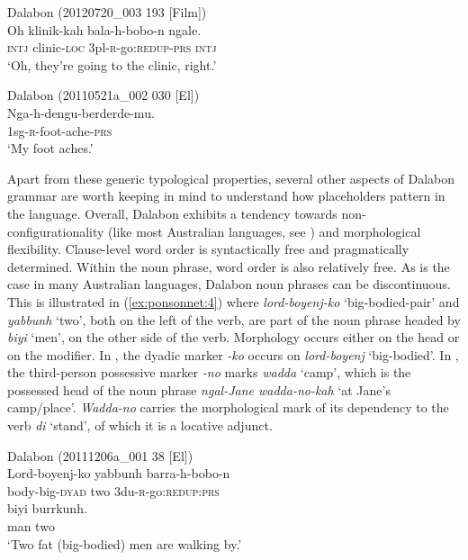 \documentclass[output=paper]{langscibook}
\begin{document}
\ea
{\label{ex:ponsonnet:2} Dalabon (20120720\_003 193 [Film])}\\
\gll Oh   klinik-kah     bala-h-bobo-n     ngale.\\
\textsc{intj}  clinic-\textsc{loc}   3pl-\textsc{r}{}-go:\textsc{redup-prs}  \textsc{intj}\\
\glt ‘Oh, they’re going to the clinic, right.’
\z 


\ea
{\label{ex:ponsonnet:3}
Dalabon (20110521a\_002 030 [El])}\\
\gll Nga-h-dengu-berderde-mu.\\
     1sg\textsc{{}-r-}foot-ache\textsc{{}-prs}\\
\glt ‘My foot aches.’
\z 

Apart from these generic typological properties, several other aspects of Dalabon grammar are worth keeping in mind to understand how placeholders pattern in the language. Overall, Dalabon exhibits a tendency towards non\hyp configurationality (like most Australian languages, see \citealt{AustinAustin1996}) and morphological flexibility. Clause-level word order is syntactically free and pragmatically determined. Within the noun phrase, word order is also relatively free. As is the case in many Australian languages, Dalabon noun phrases can be discontinuous. This is illustrated in (\ref{ex:ponsonnet:4}) where \textit{lord-boyenj-ko} ‘big-bodied-pair’ and \textit{yabbunh} ‘two’, both on the left of the verb, are part of the noun phrase headed by \textit{biyi} ‘men’, on the other side of the verb. Morphology occurs either on the head or on the modifier. In , the dyadic marker \textit{{}-ko} occurs on \textit{lord-boyenj} ‘big-bodied’. In , the third-person possessive marker \textit{{}-no} marks \textit{wadda} ‘camp’, which is the possessed head of the noun phrase \textit{ngal-Jane wadda-no-kah} ‘at Jane’s camp/place’. \textit{Wadda-no} carries the morphological mark of its dependency to the verb \textit{di} ‘stand’, of which it is a locative adjunct.
 
\ea
{ \label{ex:ponsonnet:4}
Dalabon (20111206a\_001 38 [El])}\\
\gll Lord-boyenj-ko   yabbunh   barra-h-bobo-n\\
body-big-\textsc{dyad}  two    3du-\textsc{r}{}-go:\textsc{redup:prs}\\
\gll biyi   burrkunh.\\
     man  two \\
\glt ‘Two fat (big-bodied) men are walking by.’
\z 
\end{document}
